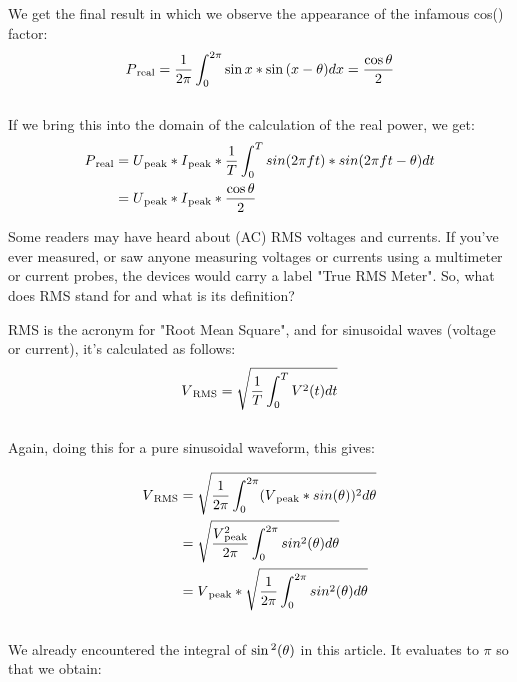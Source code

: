 \documentclass[a4paper]{article}
\def\SP#1{\textsuperscript{#1}}
\def\SB#1{\textsubscript{{#1}}}
\def\SPSB#1#2{\rlap{\textsuperscript{#1}}\SB{#2}}
\begin{document}
We get the final result in which we observe the appearance of
the infamous cos(\phi) factor:\\

\begin{align*}
  P\SB{real} &=\frac{1}{2 \pi}\int_0^{2\pi}\sin{x} * \sin{(x - \theta)}dx = \frac{\cos{\theta}}{2}\\
\end{align*}\\

If we bring this into the domain of the calculation of the real power,
we get:\\

\begin{align*}
  P\SB{real} &= U\SB{peak} * I\SB{peak} * \frac{1}{T} \int_0^{T}{sin(2\pi ft) * sin(2\pi ft - \theta)} dt\\
  &= U\SB{peak} * I\SB{peak} * \frac{\cos{\theta}}{2}\\
\end{align*}

Some readers may have heard about (AC) RMS voltages and currents. If
you've ever measured, or saw anyone measuring voltages or currents using a
multimeter or current probes, the devices would carry a label "True RMS
Meter". So, what does RMS stand for and what is its definition?

RMS is the acronym for "Root Mean Square",  and for sinusoidal waves (voltage
or current), it's calculated as follows:\\

\begin{align*}
  V\SB{RMS} &= \sqrt{\frac{1}{T} \int_0^{T} V\SP{2}(t) dt}\\
\end{align*}\\

Again, doing this for a pure sinusoidal waveform, this gives:

\begin{align*}
  V\SB{RMS} &= \sqrt{\frac{1}{2 \pi} \int_0^{2 \pi} (V\SB{peak} * sin(\theta))\SP{2} d\theta}\\
  &= \sqrt{\frac{V\SPSB{2}{peak}}{2 \pi} \int_0^{2 \pi} sin\SP{2}(\theta) d\theta}\\
  &= V\SB{peak} * \sqrt{\frac{1}{2 \pi} \int_0^{2 \pi} sin\SP{2}(\theta) d\theta}\\
\end{align*}\\

We already encountered the integral of $\sin\SP{2}(\theta)$ in this article.
It evaluates to $\pi$ so that we obtain:\\
\end{document}
